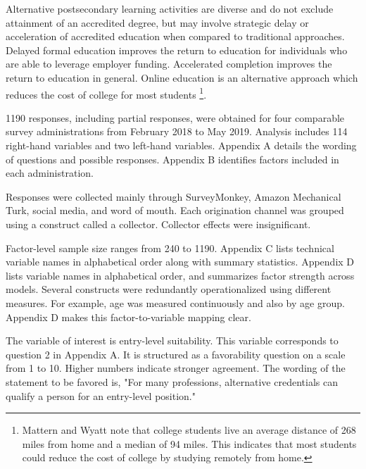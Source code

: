\documentclass[AER]{./aea-latex-templates/AEA}
\begin{document}
        Alternative postsecondary learning activities are diverse and do not
        exclude attainment of an accredited degree, but may involve strategic
        delay or acceleration of accredited education when compared to traditional approaches.
        Delayed formal education improves the return to education for
        individuals who are able to leverage employer funding. Accelerated completion improves the return
        to education in general.
        Online education is an alternative approach which reduces the cost of college for most students
        \footnote{
            Mattern and Wyatt\cite{mattern2009student} note that college students live an average distance of
            268 miles from home and a median of 94 miles. This indicates that most students could reduce
            the cost of college by studying remotely from home.
        }.
        
        1190 responses, including partial responses, were obtained for four
        comparable survey administrations from February 2018 to May 2019.
        Analysis includes 114 right-hand variables and two left-hand variables.
        Appendix A details the wording of questions and possible responses.
        Appendix B identifies factors included in each administration.

        Responses were collected mainly through SurveyMonkey, Amazon Mechanical
        Turk, social media,
        and word of mouth. Each origination channel was grouped using a construct
        called a collector. Collector effects were insignificant.
        
        Factor-level sample size ranges from 240 to 1190. Appendix C lists
        technical variable names in alphabetical order along with summary
        statistics. Appendix D lists variable names in alphabetical order, and
        summarizes factor strength across models.
        Several constructs were redundantly
        operationalized using different measures. For example, age was measured
        continuously and also by age group. Appendix D makes this
        factor-to-variable mapping clear.
        
        The variable of interest is entry-level suitability.
        This variable corresponds to question 2 in Appendix A.
        It is structured as a favorability question on a scale from 1 to 10. Higher numbers indicate
        stronger agreement.
        The wording of the statement to be favored is,
        "For many professions, alternative credentials can qualify a person for an entry-level position."
        
\end{document}
